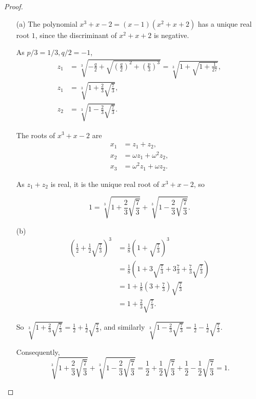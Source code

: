 \documentclass[11pt,a4paper]{article}
\begin{document}
\begin{proof}
\begin{enumerate}
\item[(a)] The polynomial $x^3+x-2 = (x-1)(x^2+x+2)$ has a unique real root $1$, since the discriminant of $x^2+x+2$ is negative.

As $p/3=1/3,q/2=-1$,
\begin{align*}
z_1 &= \sqrt[3]{-\frac{q}{2}+\sqrt{\left(\frac{q}{2}\right)^2 + \left(\frac{p}{3}\right)^3}}
= \sqrt[3]{1+\sqrt{1 +\frac{1}{27}}},\\
z_1&= \sqrt[3]{1 + \frac{2}{3} \sqrt{\frac{7}{3}}},\\
z_2 &= \sqrt[3]{1 - \frac{2}{3} \sqrt{\frac{7}{3}}}.
\end{align*}

The roots of $x^3+x-2$ are
\begin{align*}
x_1 &= z_1 + z_2,\\
x_2 &= \omega z_1 + \omega^2 z_2,\\
x_3 &= \omega^2 z_1 + \omega z_2.
\end{align*}

As $z_1 + z_2$ is real, it is the unique real root of $x^3+x-2$, so

$$1 = \sqrt[3]{1 + \frac{2}{3} \sqrt{\frac{7}{3}}} + \sqrt[3]{1 - \frac{2}{3} \sqrt{\frac{7}{3}}}.$$


\item[(b)] 
\begin{align*}
\left(\frac{1}{2}+ \frac{1}{2}\sqrt{\frac{7}{3}} \right)^3 &= \frac{1}{8} \left(1 + \sqrt{\frac{7}{3}}\right)^3\\
&=\frac{1}{8} \left( 1 + 3\sqrt{\frac{7}{3}} + 3 \frac{7}{3} + \frac{7}{3}\sqrt{\frac{7}{3}}\right)\\
&=1 + \frac{1}{8}\left(3 + \frac{7}{3} \right)\sqrt{\frac{7}{3}}\\
&=1 + \frac{2}{3} \sqrt{\frac{7}{3}}.
\end{align*}

So $\sqrt[3]{1 + \frac{2}{3} \sqrt{\frac{7}{3}}} = \frac{1}{2}+ \frac{1}{2}\sqrt{\frac{7}{3}} $, and similarly $\sqrt[3]{1 - \frac{2}{3} \sqrt{\frac{7}{3}}} = \frac{1}{2}- \frac{1}{2}\sqrt{\frac{7}{3}} $.

Consequently,
$$\sqrt[3]{1 + \frac{2}{3} \sqrt{\frac{7}{3}}} + \sqrt[3]{1 - \frac{2}{3} \sqrt{\frac{7}{3}}}  =  \frac{1}{2}+ \frac{1}{2}\sqrt{\frac{7}{3}}+  \frac{1}{2}- \frac{1}{2}\sqrt{\frac{7}{3}} = 1.$$

\end{enumerate}
\end{proof}
\end{document}
